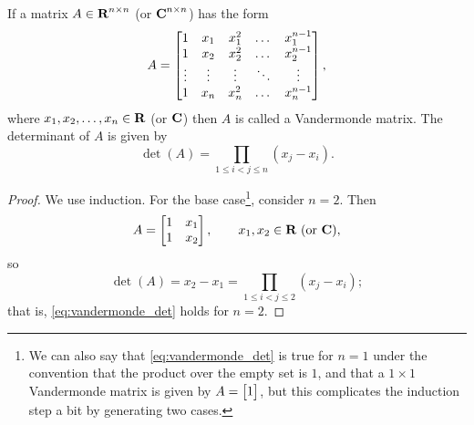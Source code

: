 \documentclass{homework}
\begin{document}
	\question If a matrix $A \in \textnormal{\bf R}^{n\times n}$ (or $\textnormal{\bf C}^{n\times n}$) has the form
	\begin{equation*}
		A = \left[\begin{matrix}
			1 & x_1 & x_1^2 & \dots & x_1^{n-1} \\ 
			1 & x_2 & x_2^2 & \dots & x_2^{n-1} \\
			\vdots & \vdots & \vdots & \ddots & \vdots \\
			1 & x_n & x_n^2 & \dots & x_n^{n-1}
		\end{matrix}\right],
	\end{equation*}
	where $x_1,x_2,\dots,x_n \in \textnormal{\bf R}$ (or $\textnormal{\bf C}$) then $A$ is called a Vandermonde matrix. The determinant of $A$ is given by
	\begin{equation}
		\label{eq:vandermonde_det}
		\det(A) = \prod_{1\le i < j \le n} (x_j - x_i).
	\end{equation}
	\begin{proof}
		We use induction. For the base case\footnote{We can also say that \eqref{eq:vandermonde_det} is true for $n=1$ under the convention that the product over the empty set is $1$, and that a $1\times 1$ Vandermonde matrix is given by $A = \left[\begin{matrix}1\end{matrix}\right]$, but this complicates the induction step a bit by generating two cases.}, consider $n = 2$. Then
		\begin{equation*}
			A = \left[\begin{matrix}1 & x_1 \\ 1 & x_2\end{matrix}\right], \qquad x_1, x_2\in \textnormal{\bf R} \text{ (or $\textnormal{\bf C}$)},
		\end{equation*}
		so
		\begin{equation*}
			\det(A) = x_2 -x_1 = \prod_{1 \le i < j \le 2} (x_j - x_i);
		\end{equation*}
		that is, \eqref{eq:vandermonde_det} holds for $n = 2$.
		

\end{proof}
\end{document}
